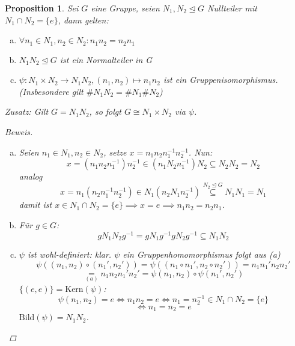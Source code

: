 \documentclass[a4paper]{article}
\theoremstyle{plain}
\newtheorem{prop}[thm]{Proposition}
\theoremstyle{definition}
\begin{document}
\begin{prop}
  Sei $G$ eine Gruppe, seien $N_{1}, N_{2} \trianglelefteq G$ Nullteiler mit $N_{1} \cap N_{2} = \{e\}$, dann gelten:
  \begin{enumerate}[(a)]
    \item $\forall n_{1} \in N_{1}, n_{2} \in N_{2}: n_{1}n_{2} = n_{2}n_{1}$
    \item $N_{1}N_{2} \trianglelefteq G$ ist ein Normalteiler in G
    \item $\psi : N_{1} \times N_{2} \to N_{1}N_{2}, (n_{1},n_{2}) \mapsto n_{1}n_{2}$ ist ein Gruppenisomorphismus. (Insbesondere gilt $\#N_{1}N_{2} = \#N_{1} \#N_{2}$)
  \end{enumerate}
  Zusatz: Gilt $G = N_{1}N_{2}$, so folgt $G \cong N_{1} \times N_{2}$ via $\psi$.
  \begin{proof}[Beweis]
\begin{enumerate}[(a)]
  \item  Seien $n_{1} \in N_{1}, n_{2} \in N_{2}$, setze $x = n_{1}n_{2}n_{1}^{-1}n_{2}^{-1}$.
        Nun: $$x = (n_{1}n_{2}n_{1}^{-1})n_{2}^{-1} \in (n_{1}N_{2}n_{1}^{-1})N_{2} \subseteq N_{2}N_{2} = N_{2}$$
        analog $$x = n_{1}(n_{2}n_{1}^{-1}n_{2}^{-1}) \in N_{1}(n_{2}N_{1}n_{2}^{-1}) \overset{N_{2} \trianglelefteq G}\subseteq N_{1}N_{1} = N_{1}$$
        damit ist $x \in N_{1} \cap N_{2} = \{e\} \implies x = e \implies n_{1}n_{2} = n_{2}n_{1}$.

  \item Für $g \in G$:
        $$gN_{1}N_{2}g^{-1}= gN_{1}g^{-1}gN_{2}g^{-1} \subseteq  N_{1}N_{2}$$

  \item $\psi$ ist wohl-definiert: klar. $\psi$ ein Gruppenhomomorphismus folgt aus (a)
        $$\psi((n_{1}, n_{2}) \circ (n_{1}', n_{2}')) = \psi((n_{1} \circ n_{1}', n_{2} \circ n_{2}')) = n_{1}n_{1}' n_{2}n_{2}'$$
        $$\underset{(a)}= n_{1}n_{2}n_{1}'n_{2}' = \psi(n_{1}, n_{2}) \circ \psi(n_{1}', n_{2}')$$
        $\{(e, e)\} = \mathrm{Kern}(\psi)$:
        $$\psi(n_{1}, n_{2}) = e \iff n_{1}n_{2} = e \iff n_{1} = n_{2}^{-1} \in N_{1}\cap N_{2} = \{e\}$$
        $$\iff n_{1} = n_{2} = e$$
$\mathrm{Bild}(\psi) = N_{1}N_{2}$.
\end{enumerate}
  \end{proof}
\end{prop}
\end{document}
